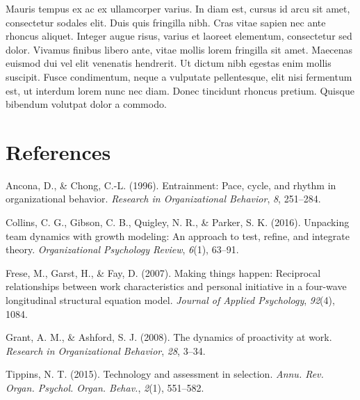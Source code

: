 \documentclass[english,,man]{apa6}
\begin{document}
Mauris tempus ex ac ex ullamcorper varius. In diam est, cursus id arcu sit amet, consectetur sodales elit. Duis quis fringilla nibh. Cras vitae sapien nec ante rhoncus aliquet. Integer augue risus, varius et laoreet elementum, consectetur sed dolor. Vivamus finibus libero ante, vitae mollis lorem fringilla sit amet. Maecenas euismod dui vel elit venenatis hendrerit. Ut dictum nibh egestas enim mollis suscipit. Fusce condimentum, neque a vulputate pellentesque, elit nisi fermentum est, ut interdum lorem nunc nec diam. Donec tincidunt rhoncus pretium. Quisque bibendum volutpat dolor a commodo.

\newpage

\hypertarget{references}{%
\section{References}\label{references}}

\setlength{\parindent}{-0.5in}
\setlength{\leftskip}{0.5in}

\hypertarget{refs}{}
\leavevmode\hypertarget{ref-ancona_entrainment}{}%
Ancona, D., \& Chong, C.-L. (1996). Entrainment: Pace, cycle, and rhythm in organizational behavior. \emph{Research in Organizational Behavior}, \emph{8}, 251--284.

\leavevmode\hypertarget{ref-collins2016unpacking}{}%
Collins, C. G., Gibson, C. B., Quigley, N. R., \& Parker, S. K. (2016). Unpacking team dynamics with growth modeling: An approach to test, refine, and integrate theory. \emph{Organizational Psychology Review}, \emph{6}(1), 63--91.

\leavevmode\hypertarget{ref-frese2007making}{}%
Frese, M., Garst, H., \& Fay, D. (2007). Making things happen: Reciprocal relationships between work characteristics and personal initiative in a four-wave longitudinal structural equation model. \emph{Journal of Applied Psychology}, \emph{92}(4), 1084.

\leavevmode\hypertarget{ref-grant2008dynamics}{}%
Grant, A. M., \& Ashford, S. J. (2008). The dynamics of proactivity at work. \emph{Research in Organizational Behavior}, \emph{28}, 3--34.

\leavevmode\hypertarget{ref-tippins2015technology}{}%
Tippins, N. T. (2015). Technology and assessment in selection. \emph{Annu. Rev. Organ. Psychol. Organ. Behav.}, \emph{2}(1), 551--582.
\end{document}
